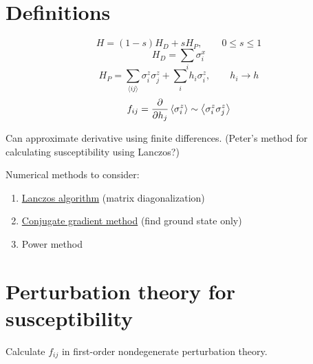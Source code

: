 %

\usepackage{hyperref}

\newcommand{\ham}{H}
\newcommand{\nnsum}[2]{\sum_{\langle #1 #2 \rangle}}
\newcommand{\cc}{\mathrm{c.c.}}
\newcommand{\nghbr}[2]{b(#1,\,#2)}



\section*{Definitions}

\begin{equation}
  \ham = (1 - s) \ham_D + s \ham_P,
  \qquad
  0 \leq s \leq 1
  \label{def-h_qaa}
\end{equation}
\begin{equation}
  \ham_D = \sum_i \sigma^x_i
  \label{def-h_d}
\end{equation}
\begin{equation}
  \ham_P = \nnsum{i}{j} \sigma^z_i \sigma^z_j + \sum_i h_i \sigma^z_i,
  \qquad
  h_i \rightarrow h
  \label{def-h_p}
\end{equation}
\begin{equation}
  f_{ij} = \frac{\partial }{\partial h_j} \left< \sigma^z_i \right>
  \sim \left< \sigma^z_i \sigma^z_j \right>
  \label{def-f}
\end{equation}

Can approximate derivative using finite differences. (Peter's method for
calculating susceptibility using Lanczos?)

Numerical methods to consider:
\begin{enumerate}
  \item \href{http://en.wikipedia.org/wiki/Lanczos_algorithm}
    {Lanczos algorithm} (matrix diagonalization)
  \item \href{http://en.wikipedia.org/wiki/Conjugate_gradient_method}
    {Conjugate gradient method} (find ground state only)
  \item Power method
\end{enumerate}

\section*{Perturbation theory for susceptibility}

Calculate $f_{ij}$ in first-order nondegenerate perturbation theory.

